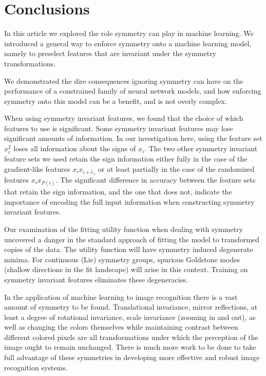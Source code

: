 \documentclass[twocolumn, nofootinbib, aps, prb]{revtex4-1}
\begin{document}
\section{Conclusions}\label{Sec:conclusions}

In this article we explored the role symmetry can play in machine learning. We introduced a general way to enforce symmetry onto a machine learning model, namely to preselect features that are invariant under the symmetry transformations.

We demonstrated the dire consequences ignoring symmetry can have on the performance of a constrained family of neural network models, and how enforcing symmetry onto this model can be a benefit, and is not overly complex.

When using symmetry invariant features, we found that the choice of which features to use is significant. Some symmetry invariant features may lose significant amounts of information. In our investigation here, using the feature set $x_i^2$ loses all information about the signs of $x_i$. The two other symmetry invariant feature sets we used retain the sign information either fully in the case of the gradient-like features $x_i x_{i + {\hat e}_1}$ or at least partially in the case of the randomized features $x_i x_{P(i)}$. The significant difference in accuracy between the feature sets that retain the sign information, and the one that does not, indicate the importance of encoding the full input information when constructing symmetry invariant features.

Our examination of the fitting utility function when dealing with symmetry uncovered a danger in the standard approach of fitting the model to transformed copies of the data. The utility function will have symmetry induced degenerate minima. For continuous (Lie) symmetry groups, spurious Goldstone modes (shallow directions in the fit landscape) will arise in this context. Training on symmetry invariant features eliminates these degeneracies. 

In the application of machine learning to image recognition there is a vast amount of symmetry to be found. Translational invariance, mirror reflections, at least a degree of rotational invariance, scale invariance (zooming in and out), as well as changing the colors themselves while maintaining contrast between different colored pixels are all transformations under which the perception of the image ought to remain unchanged. There is much more work to be done to take full advantage of these symmetries in developing more effective and robust image recognition systems.
\end{document}

